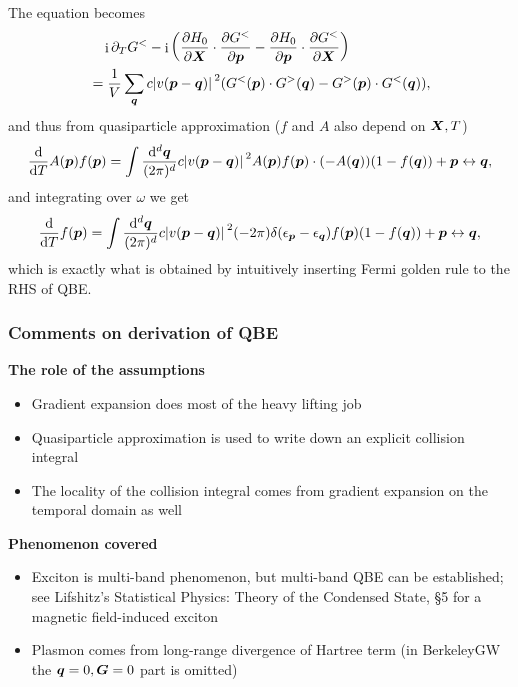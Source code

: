 \documentclass[t]{beamer}
\DeclareMathOperator{\ii}{i}
\begin{document}
\begin{frame}[allowframebreaks]
The equation becomes 
\begin{equation}
    \begin{aligned}
        &\quad \ii \partial_T G^< 
        - \ii \left(
            \pdv{H_0}{\vb*{X}} \cdot \pdv{G^<}{\vb*{p}}
            - \pdv{H_0}{\vb*{p}} \cdot \pdv{G^<}{\vb*{X}}
        \right)  \\
        &= \frac{1}{V} \sum_{\vb*{q}} c \abs*{v(\vb*{p} - \vb*{q})}^2 
        ( G^<(\vb*{p}) \cdot G^>(\vb*{q})
        - G^>(\vb*{p}) \cdot G^<(\vb*{q}) ),
    \end{aligned}
\end{equation}
and thus from quasiparticle approximation 
($f$ and $A$ also depend on $\vb*{X}, T$)
\begin{equation}
    \dv{T} A(\vb*{p}) f(\vb*{p}) 
    = \int \frac{\dd[d]{\vb*{q}}}{(2\pi)^d} 
    c \abs*{v(\vb*{p} - \vb*{q})}^2 
    A(\vb*{p}) f(\vb*{p}) \cdot (- A(\vb*{q})) (1 - f(\vb*{q})) + \vb*{p} \leftrightarrow \vb*{q},
\end{equation}
and integrating over $\omega$ we get 
\begin{equation}
    \dv{T} f(\vb*{p}) = \int \frac{\dd[d]{\vb*{q}}}{(2\pi)^d} 
    c \abs*{v(\vb*{p} - \vb*{q})}^2 
    (- 2 \pi) \delta(\epsilon_{\vb*{p}} - \epsilon_{\vb*{q}}) f(\vb*{p}) (1 - f(\vb*{q}))
    + \vb*{p} \leftrightarrow \vb*{q},
\end{equation}
which is exactly what is obtained by 
intuitively inserting Fermi golden rule to the RHS of QBE.

\end{frame}

\begin{frame}
\frametitle{Comments on derivation of QBE}

\textbf{The role of the assumptions}

\begin{itemize}
    \item Gradient expansion does most of the heavy lifting job
    \item Quasiparticle approximation is used to write down 
        an explicit collision integral 
    \item The locality of the collision integral comes from 
        gradient expansion on the temporal domain as well 
\end{itemize} 

\textbf{Phenomenon covered}

\begin{itemize}
    \item Exciton is multi-band phenomenon, but 
        multi-band QBE can be established; 
        see Lifshitz's Statistical Physics: Theory of the Condensed State, \S 5 
        for a magnetic field-induced exciton 
    \item Plasmon comes from long-range divergence of Hartree term
        (in BerkeleyGW the $\vb*{q} = 0, \vb*{G} = 0$ part is omitted)
\end{itemize}    

\end{frame}
\end{document}
